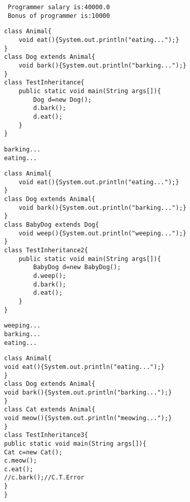 \documentclass{book}
\def\lthtmlcheckvsize{\ifdim\ht\sizebox<\vsize 
  \ifdim\wd\sizebox<\hsize\expandafter\hfill\fi \expandafter\vfill
  \else\expandafter\vss\fi}%
\begin{document}
{\newpage\clearpage
{}%
\begin{lstlisting}
 Programmer salary is:40000.0
 Bonus of programmer is:10000
\end{lstlisting}%
\lthtmlfigureZ
\lthtmlcheckvsize\clearpage}

{\newpage\clearpage
{}%
\begin{lstlisting}
class Animal{  
	void eat(){System.out.println("eating...");}  
}  
class Dog extends Animal{  
	void bark(){System.out.println("barking...");}  
}  
class TestInheritance{  
	public static void main(String args[]){  
		Dog d=new Dog();  
		d.bark();  
		d.eat();  
	}
} 
\end{lstlisting}%
\lthtmlfigureZ
\lthtmlcheckvsize\clearpage}

{\newpage\clearpage
{}%
\begin{lstlisting}
barking...
eating...
\end{lstlisting}%
\lthtmlfigureZ
\lthtmlcheckvsize\clearpage}

{\newpage\clearpage
{}%
\begin{lstlisting}
class Animal{  
	void eat(){System.out.println("eating...");}  
}  
class Dog extends Animal{  
	void bark(){System.out.println("barking...");}  
}  
class BabyDog extends Dog{  
	void weep(){System.out.println("weeping...");}  
}  
class TestInheritance2{  
	public static void main(String args[]){  
		BabyDog d=new BabyDog();  
		d.weep();  
		d.bark();  
		d.eat();  
	}
} 
\end{lstlisting}%
\lthtmlfigureZ
\lthtmlcheckvsize\clearpage}

{\newpage\clearpage
{}%
\begin{lstlisting}
weeping...
barking...
eating...
\end{lstlisting}%
\lthtmlfigureZ
\lthtmlcheckvsize\clearpage}

{\newpage\clearpage
{}%
\begin{lstlisting}
class Animal{  
void eat(){System.out.println("eating...");}  
}  
class Dog extends Animal{  
void bark(){System.out.println("barking...");}  
}  
class Cat extends Animal{  
void meow(){System.out.println("meowing...");}  
}  
class TestInheritance3{  
public static void main(String args[]){  
Cat c=new Cat();  
c.meow();  
c.eat();  
//c.bark();//C.T.Error  
}
}
\end{lstlisting}%
\lthtmlfigureZ
\lthtmlcheckvsize\clearpage}
\end{document}
